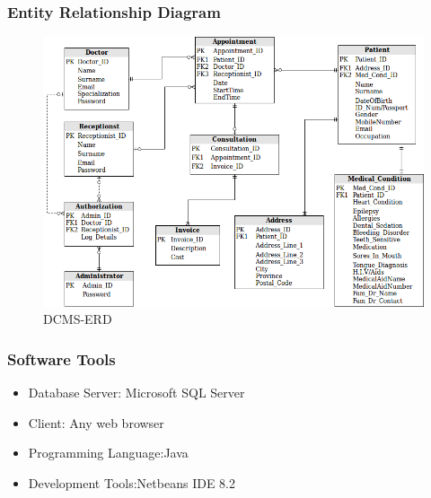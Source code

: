 \documentclass[11 pt]{article}
\begin{document}
    \subsubsection{Entity Relationship Diagram}

    \begin{figure}[h]
    \centering
    
    \includegraphics[width=\linewidth]{Dentist ERD.png}
    \caption{DCMS-ERD}
    \label{fig:ERD}
    \end{figure}
    
    \subsubsection{Software Tools}
    \begin{itemize}
    \item
     Database Server: Microsoft SQL Server
    \item
     Client: Any web browser
     \item
     Programming Language:Java
     \item
     Development Tools:Netbeans IDE 8.2
    \end{itemize}
    
\end{document}
